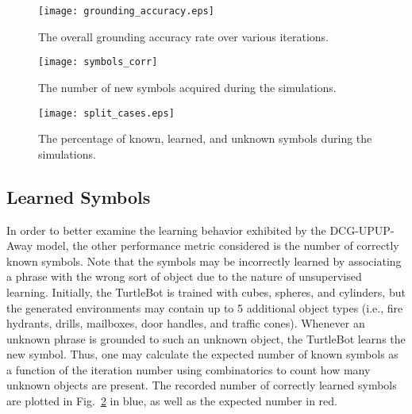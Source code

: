 \begin{figure}[htb!]
\centering
\texttt{[image: grounding\_accuracy.eps]}
\caption{The overall grounding accuracy rate over various iterations.}
\label{fig:g_acc}
\end{figure}




\begin{figure}[htb!]
\centering
\texttt{[image: symbols\_corr]}
\caption{The number of new symbols acquired during the simulations.}
\label{fig:symbols}
\end{figure}

\begin{figure}[htb!]
\centering
\texttt{[image: split\_cases.eps]}
\caption{The percentage of known, learned, and unknown symbols during the simulations.}
\label{fig:g_acc_split}
\end{figure}




\subsection{Learned Symbols}
In order to better examine the learning behavior exhibited by the DCG-UPUP-Away model, the other performance metric considered is the number of correctly known symbols. Note that the symbols may be incorrectly learned by associating a phrase with the wrong sort of object due to the nature of unsupervised learning.
Initially, the TurtleBot is trained with cubes, spheres, and cylinders, but the generated environments may contain up to 5 additional object types (i.e., fire hydrants, drills, mailboxes, door handles, and traffic cones).
Whenever an unknown phrase is grounded to such an unknown object, the TurtleBot learns the new symbol.
Thus, one may calculate the expected number of known symbols as a function of the iteration number using combinatorics to count how many unknown objects are present.
The recorded number of correctly learned symbols are plotted in Fig.~\ref{fig:symbols} in blue, as well as the expected number in red.


